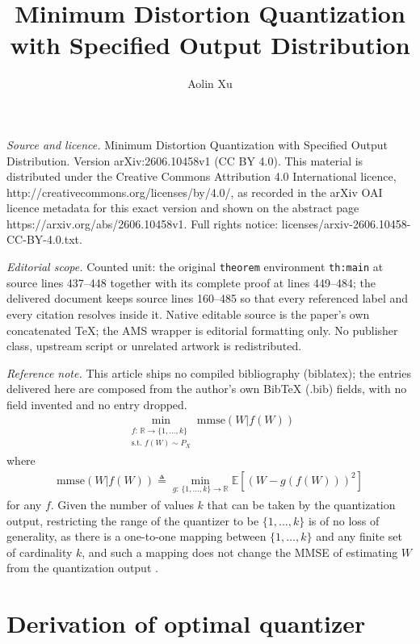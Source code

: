 \documentclass[10pt,a4paper]{amsart}
\newcommand{\R}{\mathbb{R}}
\newcommand{\E}{\mathbb{E}}
\def\deq{\triangleq}
\begin{document}
\title[Minimum Distortion Quantization with Specified Output Distri]{Minimum Distortion Quantization with Specified Output Distribution}
\author{Aolin Xu}
\date{}
\maketitle
\noindent\emph{Source and licence.} Minimum Distortion Quantization with Specified Output Distribution. Version arXiv:2606.10458v1 (CC BY 4.0). This material is distributed under the Creative Commons Attribution 4.0 International licence, http://creativecommons.org/licenses/by/4.0/, as recorded in the arXiv OAI licence metadata for this exact version and shown on the abstract page https://arxiv.org/abs/2606.10458v1. Full rights notice: licenses/arxiv-2606.10458-CC-BY-4.0.txt.\par\smallskip
\noindent\textit{Editorial scope.} Counted unit: the original \texttt{theorem} environment \texttt{th:main} at source lines 437--448 together with its complete proof at lines 449--484; the delivered document keeps source lines 160--485 so that every referenced label and every citation resolves inside it. Native editable source is the paper's own concatenated TeX; the AMS wrapper is editorial formatting only. No publisher class, upstream script or unrelated artwork is redistributed.
\par\smallskip\noindent\textit{Reference note.} This article ships no compiled bibliography (biblatex); the entries delivered here are composed from the author's own BibTeX (.bib) fields, with no field invented and no entry dropped.
\begin{align}
    \min_{\substack{f:\,\R \rightarrow \{1,\ldots,k\} \\ \text{s.t. } f(W)\sim P_X}} \text{mmse}(W|f(W)) \label{eq:opt1}
\end{align}
where 
\begin{align}
\text{mmse}(W|f(W)) \deq \min_{g:\,\{1,\ldots,k\}\rightarrow\R}\E[(W-g(f(W)))^2]    
\end{align}
for any $f$.
Given the number of values $k$ that can be taken by the quantization output, restricting the range of the quantizer to be 
$\{1,\ldots,k\}$ is of no loss of generality, as there is a one-to-one mapping between $\{1,\ldots,k\}$ and any finite set of cardinality $k$, and such a mapping does not change the MMSE of estimating $W$ from the quantization output \cite[Lemma~1]{MER2022}.


\section{Derivation of optimal quantizer}
\end{document}
